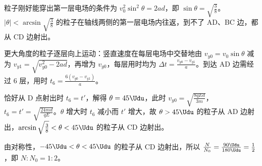 \documentclass[\gkver]{gaokaozhenti}
\begin{document}
\begin{enumerate}
{\begin{enumerate}
	粒子刚好能穿出第一层电场的条件为 $v_{0}^{2}\sin^{2}\theta=2ad$，即 $\sin\theta=\sqrt{\frac{3}{8}}$。$|\theta|<\arcsin\sqrt{\frac{3}{8}}$ 的粒子在轴线两侧的第一层电场内往返，到不了 AD、BC 边，都从 CD 边射出。

	更大角度的粒子逐层向上运动：竖直速度在每层电场中交替地由 $v_{y0}=v_{0}\sin\theta$ 减为 $v_{y1}=\sqrt{v_{y0}^{2}-2ad}$，再增为 $v_{y0}$，每层用时均为 $\Delta t=\frac{v_{y0}-v_{y1}}{a}$。到达 AD 边需经过 6 层，用时 $t_{6}=\frac{6(v_{y0}-v_{y1})}{a}$。

	恰好从 D 点射出时 $t_{6}=t'$，解得 $\theta=45\Udu$，此时 $v_{y0}=\sqrt{\frac{8qEd}{3m}}$，$t_{6}=t'=\sqrt{\frac{24md}{qE}}$。$\theta$ 增大时 $t_{6}$ 减小而 $t'$ 增大，故 $\theta>45\Udu$ 的粒子从 AD 边射出，$\arcsin\sqrt{\frac{3}{8}}<\theta<45\Udu$ 的粒子从 CD 边射出。

	由对称性，$-45\Udu<\theta<45\Udu$ 的粒子从 CD 边射出，所以 $\frac{N}{N_{0}}=\frac{90\Udu}{180\Udu}=\frac{1}{2}$，即 $N:N_{0}=1:2$。
\end{enumerate}
}

\end{enumerate}
\end{document}
